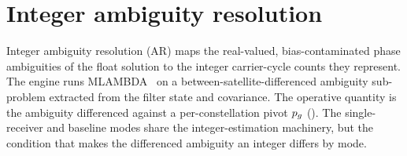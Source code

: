 \documentclass[main.tex]{subfiles}
\begin{document}
\section{Integer ambiguity resolution}\label{sec:ar}

Integer ambiguity resolution (AR) maps the real-valued, bias-contaminated
phase ambiguities of the float solution to the integer carrier-cycle
counts they represent.  The engine runs
\textsc{MLAMBDA}~\cite{teunissen1995lambda} on a
between-satellite-differenced ambiguity sub-problem extracted from the
filter state and covariance.  The operative quantity is the ambiguity
differenced against a per-constellation pivot $p_{g}$
().  The single-receiver and baseline modes share the
integer-estimation machinery, but the condition that makes the
differenced ambiguity an integer differs by mode.
\end{document}
